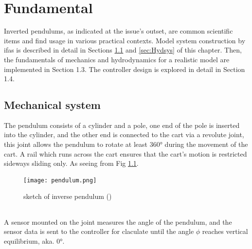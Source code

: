 \chapter{Fundamental}
\label{ch:fundamental}

Inverted pendulums, as indicated at the issue's outset, 
are common scientific items and find usage in various practical contexts.
Model system construction by ifas is described in detail in Sections \ref{sec:Mecsys}
and \ref{sec:Hydsys} of this chapter. Then, the fundamentals of mechanics and 
hydrodynamics for a realistic model are implemented in Section 1.3. 
The controller design is explored in detail in Section 1.4.


\section{Mechanical system} %
\label{sec:Mecsys}

The pendulum consists of a cylinder and a pole, 
one end of the pole is inserted into the cylinder,
and the other end is connected to the cart via a revolute joint,
this joint allows the pendulum to rotate at least 360° during 
the movement of the cart. A rail which runs across the cart ensures that 
the cart's motion is restricted sideways sliding only. As seeing from Fig \ref*{fig:pendulum}.\\
\begin{figure}[htbp]
    \centering
    \texttt{[image: pendulum.png]}
    \caption[Inverse pendulum sketch]{sketch of inverse pendulum (\cite[]{skependel})
    \label{fig:pendulum}} %
\end{figure}\\
A sensor mounted on the joint measures the angle of the pendulum, and the sensor data is sent 
to the controller for claculate until the angle \ensuremath{\phi} reaches vertical equilibrium, aka. 0°.

